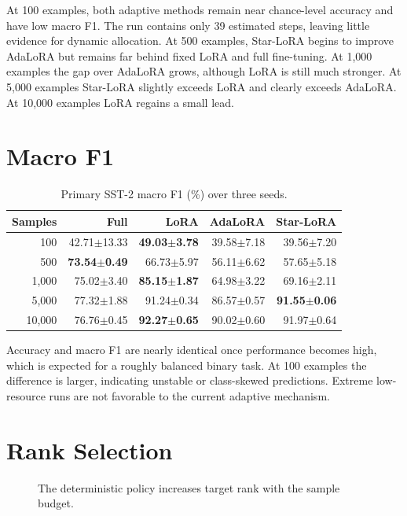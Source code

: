 At 100 examples, both adaptive methods remain near chance-level accuracy and have low macro F1.
The run contains only 39 estimated steps, leaving little evidence for dynamic allocation. At 500
examples, Star-LoRA begins to improve AdaLoRA but remains far behind fixed LoRA and full
fine-tuning. At 1,000 examples the gap over AdaLoRA grows, although LoRA is still much stronger.
At 5,000 examples Star-LoRA slightly exceeds LoRA and clearly exceeds AdaLoRA. At 10,000 examples
LoRA regains a small lead.

\section{Macro F1}

\begin{table}[H]
\centering
\caption{Primary SST-2 macro F1 (\%) over three seeds.}
\label{tab:primary-f1}
\small
\begin{tabular}{@{}rrrrr@{}}
\toprule
Samples & Full & LoRA & AdaLoRA & Star-LoRA \\
\midrule
100   & 42.71$\pm$13.33 & \textbf{49.03$\pm$3.78} & 39.58$\pm$7.18 & 39.56$\pm$7.20 \\
500   & \textbf{73.54$\pm$0.49} & 66.73$\pm$5.97 & 56.11$\pm$6.62 & 57.65$\pm$5.18 \\
1,000 & 75.02$\pm$3.40 & \textbf{85.15$\pm$1.87} & 64.98$\pm$3.22 & 69.16$\pm$2.11 \\
5,000 & 77.32$\pm$1.88 & 91.24$\pm$0.34 & 86.57$\pm$0.57 & \textbf{91.55$\pm$0.06} \\
10,000& 76.76$\pm$0.45 & \textbf{92.27$\pm$0.65} & 90.02$\pm$0.60 & 91.97$\pm$0.64 \\
\bottomrule
\end{tabular}
\end{table}

Accuracy and macro F1 are nearly identical once performance becomes high, which is expected for a
roughly balanced binary task. At 100 examples the difference is larger, indicating unstable or
class-skewed predictions. Extreme low-resource runs are not favorable to the current adaptive
mechanism.

\section{Rank Selection}

\begin{figure}[H]
  \centering
  \caption{The deterministic policy increases target rank with the sample budget.}
  \label{fig:rank-trend}
\end{figure}

